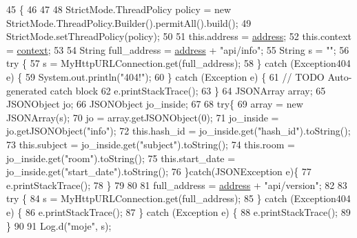\begin{DoxyCode}
45                                                                     \{
46         
47         
48         StrictMode.ThreadPolicy policy = \textcolor{keyword}{new} StrictMode.ThreadPolicy.Builder().permitAll().build(); 
49         StrictMode.setThreadPolicy(policy);
50         
51         this.address = \hyperlink{classcom_1_1example_1_1qrpoll_1_1_poll_a284d664b1db022d0fe8f089c4cad5ead}{address};
52         this.context = \hyperlink{classcom_1_1example_1_1qrpoll_1_1_poll_a22159bb6ccaf5330c7691c47fcb0ea00}{context};
53         
54         String full\_address = \hyperlink{classcom_1_1example_1_1qrpoll_1_1_poll_a284d664b1db022d0fe8f089c4cad5ead}{address} + \textcolor{stringliteral}{"api/info"};
55         String s = \textcolor{stringliteral}{""};
56         \textcolor{keywordflow}{try} \{
57             s = MyHttpURLConnection.get(full\_address);
58         \} \textcolor{keywordflow}{catch} (Exception404 e) \{
59             System.out.println(\textcolor{stringliteral}{"404!"});
60         \} \textcolor{keywordflow}{catch} (Exception e) \{
61             \textcolor{comment}{// TODO Auto-generated catch block}
62             e.printStackTrace();
63         \}
64         JSONArray array;
65         JSONObject jo;
66         JSONObject jo\_inside;
67         
68         \textcolor{keywordflow}{try}\{
69             array = \textcolor{keyword}{new} JSONArray(s);
70             jo = array.getJSONObject(0);
71             jo\_inside = jo.getJSONObject(\textcolor{stringliteral}{"info"}); 
72             this.hash\_id = jo\_inside.get(\textcolor{stringliteral}{"hash\_id"}).toString();
73             this.subject = jo\_inside.get(\textcolor{stringliteral}{"subject"}).toString();
74             this.room = jo\_inside.get(\textcolor{stringliteral}{"room"}).toString();
75             this.start\_date =  jo\_inside.get(\textcolor{stringliteral}{"start\_date"}).toString();
76         \}\textcolor{keywordflow}{catch}(JSONException e)\{
77             e.printStackTrace();
78         \}
79         
80         
81         full\_address = \hyperlink{classcom_1_1example_1_1qrpoll_1_1_poll_a284d664b1db022d0fe8f089c4cad5ead}{address} + \textcolor{stringliteral}{"api/version"};
82         
83         \textcolor{keywordflow}{try} \{
84             s = MyHttpURLConnection.get(full\_address);
85         \} \textcolor{keywordflow}{catch} (Exception404 e) \{
86             e.printStackTrace();
87         \} \textcolor{keywordflow}{catch} (Exception e) \{
88             e.printStackTrace();
89         \}
90         
91         Log.d(\textcolor{stringliteral}{"moje"}, s);

\end{DoxyCode}
